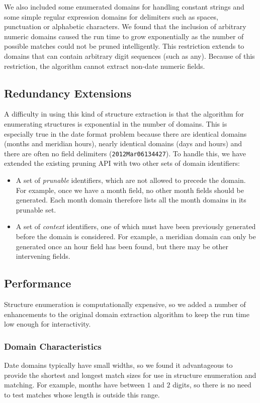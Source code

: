 We also included some enumerated domains for handling constant strings and some simple regular expression domains for delimiters such as spaces, punctuation or alphabetic characters. We found that the inclusion of arbitrary numeric domains caused the run time to grow exponentially as the number of possible matches could not be pruned intelligently. This restriction extends to domains that can contain arbitrary digit sequences (such as any). Because of this restriction, the algorithm cannot extract non-date numeric fields.

\subsection{Redundancy Extensions}
A difficulty in using this kind of structure extraction is that the algorithm for enumerating structures is exponential in the number of domains. This is especially true in the date format problem because there are identical domains (\eg months and meridian hours), nearly identical domains (\eg days and hours) and there are often no field delimiters (\eg \texttt{2012Mar06134427}). To handle this, we have extended the existing pruning API with two other sets of domain identifiers:
\begin{itemize}
\item A set of \textit{prunable} identifiers, which are not allowed to precede the domain. For example, once we have a month field, no other month fields should be generated. Each month domain therefore lists all the month domains in its prunable set.
\item A set of \textit{context} identifiers, one of which must have been previously generated before the domain is considered. For example, a meridian domain can only be generated once an hour field has been found, but there may be other intervening fields.
\end{itemize}

\subsection{Performance}
Structure enumeration is computationally expensive, so we added a number of enhancements to the original domain extraction algorithm to keep the run time low enough for interactivity.

\subsubsection{Domain Characteristics}
Date domains typically have small widths, so we found it advantageous to provide the shortest and longest match sizes for use in structure enumeration and matching. For example, months have between $1$ and $2$ digits, so there is no need to test matches whose length is outside this range.


